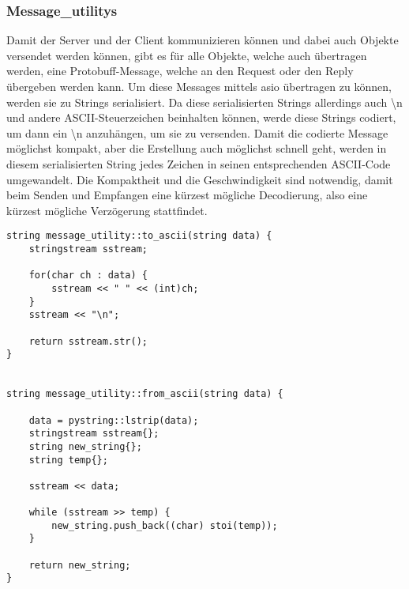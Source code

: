 \subsubsection{Message\_utilitys}
Damit der Server und der Client kommunizieren können und dabei auch Objekte versendet werden können, gibt es für alle Objekte, welche auch übertragen werden, eine Protobuff-Message, welche an den Request oder den Reply übergeben werden kann. Um diese Messages mittels asio übertragen zu können, werden sie zu Strings serialisiert. Da diese serialisierten Strings allerdings auch \textbackslash n und andere ASCII-Steuerzeichen beinhalten können, werde diese Strings codiert, um dann ein \textbackslash n anzuhängen, um sie zu versenden. Damit die codierte Message möglichst kompakt, aber die Erstellung auch möglichst schnell geht, werden in diesem serialisierten String jedes Zeichen in seinen entsprechenden ASCII-Code umgewandelt. Die Kompaktheit und die Geschwindigkeit sind notwendig, damit beim Senden und Empfangen eine kürzest mögliche Decodierung, also eine kürzest mögliche Verzögerung stattfindet.

\vspace{10mm}
\begin{addmargin}[-3em]{0em}
\begin{verbatim}
string message_utility::to_ascii(string data) {
    stringstream sstream;

    for(char ch : data) {
        sstream << " " << (int)ch;
    }
    sstream << "\n";

    return sstream.str();
}


string message_utility::from_ascii(string data) {
    
    data = pystring::lstrip(data);
    stringstream sstream{};
    string new_string{};
    string temp{};

    sstream << data;

    while (sstream >> temp) {
        new_string.push_back((char) stoi(temp));
    }
    
    return new_string;
}
\end{verbatim}
\end{addmargin}
